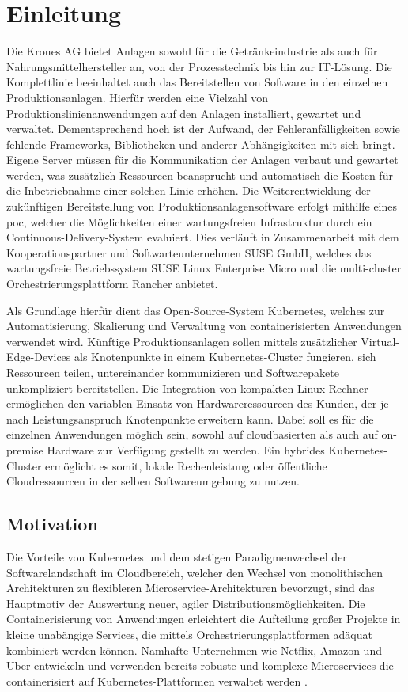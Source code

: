 \chapter{Einleitung}
Die Krones AG bietet Anlagen sowohl für die Getränkeindustrie als auch für
Nahrungsmittelhersteller an, von der Prozesstechnik bis hin zur IT-Lösung. 
Die Komplettlinie beeinhaltet auch das Bereitstellen von Software in den einzelnen Produktionsanlagen. 
Hierfür werden eine Vielzahl von Produktionslinienanwendungen auf den Anlagen installiert, gewartet
und verwaltet. Dementsprechend hoch ist der Aufwand, der Fehleranfälligkeiten sowie fehlende Frameworks, Bibliotheken
und anderer Abhängigkeiten mit sich bringt.
Eigene Server müssen für die Kommunikation der Anlagen verbaut und gewartet werden,
was zusätzlich Ressourcen beansprucht und automatisch die Kosten für die Inbetriebnahme einer solchen
Linie erhöhen. Die Weiterentwicklung der zukünftigen Bereitstellung von Produktionsanlagensoftware
erfolgt mithilfe eines \ac*{poc}, welcher die Möglichkeiten einer wartungsfreien Infrastruktur
durch ein Continuous-Delivery-System evaluiert. Dies verläuft in Zusammenarbeit mit dem
Kooperationspartner und Softwarteunternehmen SUSE GmbH, welches das wartungsfreie Betriebssystem
SUSE Linux Enterprise Micro und die multi-cluster Orchestrierungsplattform Rancher anbietet.

Als Grundlage hierfür dient das Open-Source-System Kubernetes, welches zur Automatisierung, Skalierung
und Verwaltung von containerisierten Anwendungen verwendet wird. Künftige Produktionsanlagen sollen mittels zusätzlicher Virtual-Edge-Devices
als Knotenpunkte in einem Kubernetes-Cluster fungieren, sich Ressourcen teilen, untereinander kommunizieren und Softwarepakete unkompliziert bereitstellen.
Die Integration von kompakten Linux-Rechner ermöglichen den variablen Einsatz von Hardwareressourcen des Kunden, der je nach Leistungsanspruch Knotenpunkte erweitern kann.
Dabei soll es für die einzelnen Anwendungen möglich sein, sowohl auf cloudbasierten als auch auf on-premise Hardware zur Verfügung gestellt zu werden.
Ein hybrides Kubernetes-Cluster ermöglicht es somit, lokale Rechenleistung oder öffentliche Cloudressourcen in der selben Softwareumgebung zu nutzen.
\section{Motivation}
Die Vorteile von Kubernetes und dem stetigen Paradigmenwechsel der Softwarelandschaft im Cloudbereich, welcher
den Wechsel von monolithischen Architekturen zu flexibleren Microservice-Architekturen
bevorzugt, sind das Hauptmotiv der Auswertung neuer, agiler Distributionsmöglichkeiten.
Die Containerisierung von Anwendungen erleichtert die Aufteilung großer Projekte
in kleine unabängige Services, die mittels Orchestrierungsplattformen adäquat kombiniert werden können.
Namhafte Unternehmen wie Netflix, Amazon und Uber entwickeln und verwenden
bereits robuste und komplexe Microservices die containerisiert auf Kubernetes-Plattformen
verwaltet werden \cite{microservice}. 

